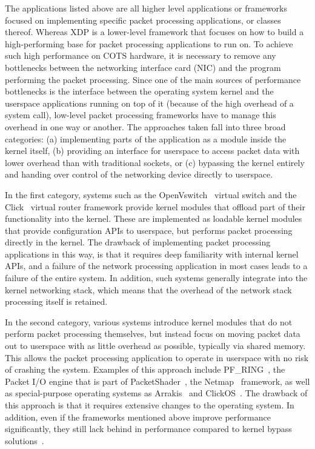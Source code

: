 \documentclass[10pt,sigconf,anonymous]{acmart}
\begin{document}
The applications listed above are all higher level applications or frameworks
focused on implementing specific packet processing applications, or classes
thereof. Whereas XDP is a lower-level framework that focuses on how to build a
high-performing base for packet processing applications to run on. To achieve
such high performance on COTS hardware, it is necessary to remove any
bottlenecks between the networking interface card (NIC) and the program
performing the packet processing. Since one of the main sources of performance
bottlenecks is the interface between the operating system kernel and the
userspace applications running on top of it (because of the high overhead of a
system call), low-level packet processing frameworks have to manage this
overhead in one way or another. The approaches taken fall into three broad
categories: (a) implementing parts of the application as a module inside the
kernel itself, (b) providing an interface for userspace to access packet data
with lower overhead than with traditional sockets, or (c) bypassing the kernel
entirely and handing over control of the networking device directly to
userspace.

In the first category, systems such as the OpenVswitch~\cite{openvswitch}
virtual switch and the Click~\cite{morris1999click} virtual router framework
provide kernel modules that offload part of their functionality into the kernel.
These are implemented as loadable kernel modules that provide configuration APIs
to userspace, but performs packet processing directly in the kernel. The
drawback of implementing packet processing applications in this way, is that it
requires deep familiarity with internal kernel APIs, and a failure of the
network processing application in most cases leads to a failure of the entire
system. In addition, such systems generally integrate into the kernel networking
stack, which means that the overhead of the network stack processing itself is
retained.

In the second category, various systems introduce kernel modules that do not
perform packet processing themselves, but instead focus on moving packet data
out to userspace with as little overhead as possible, typically via shared
memory. This allows the packet processing application to operate in userspace
with no risk of crashing the system. Examples of this approach include
PF\_RING~\cite{deri2009modern}, the Packet I/O engine that is part of
PacketShader~\cite{han2010packetshader}, the Netmap~\cite{rizzo2012netmap}
framework, as well as special-purpose operating systems as
Arrakis~\cite{peter2016arrakis} and ClickOS~\cite{martins2014clickos}. The
drawback of this approach is that it requires extensive changes to the operating
system. In addition, even if the frameworks mentioned above improve performance
significantly, they still lack behind in performance compared to kernel bypass
solutions~\cite{gallenmuller_comparison_2015}.
\end{document}
